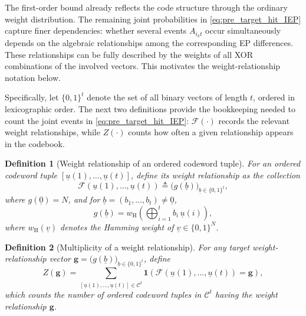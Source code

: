 \documentclass[letterpaper,draftclsnofoot,onecolumn]{IEEEtran}
\newtheorem{definition}{Definition}
\begin{document}
The first-order bound already reflects the code structure through the ordinary weight distribution. The remaining joint probabilities in \eqref{eq:pre_target_hit_IEP} capture finer dependencies: whether several events $A_{i_k t}$ occur simultaneously depends on the algebraic relationships among the corresponding EP differences. These relationships can be fully described by the weights of all XOR combinations of the involved vectors. This motivates the weight-relationship notation below.

Specifically, let $\{0,1\}^t$ denote the set of all binary vectors of length $t$, ordered in lexicographic order. The next two definitions provide the bookkeeping needed to count the joint events in \eqref{eq:pre_target_hit_IEP}: $\mathcal{F}(\cdot)$ records the relevant weight relationships, while $Z(\cdot)$ counts how often a given relationship appears in the codebook.


\begin{definition}[Weight relationship of an ordered codeword tuple]
For an ordered codeword tuple $[\underline{u}(1),\ldots,\underline{u}(t)]$, define its weight relationship as the collection
\begin{equation}\label{eq:def_weight_relationship}
\mathcal{F}(\underline{u}(1),\ldots,\underline{u}(t))
\triangleq
\bigl(g(\underline{b})\bigr)_{\underline{b}\in\{0,1\}^t},
\end{equation}
where $g(\underline{0}) = N$, and for $\underline{b}=(b_1,\ldots,b_t)\neq \underline{0}$,
\begin{equation}
g(\underline{b})
= w_{\mathrm{H}}\!\left(
\bigoplus_{i=1}^{t} b_i\,\underline{u}(i)
\right),
\label{eq:def_g}
\end{equation}
where $w_{\mathrm{H}}(\underline{v})$ denotes the Hamming weight of $\underline{v}\in\{0,1\}^N$.
\end{definition}

\begin{definition}[Multiplicity of a weight relationship]
For any target weight-relationship vector $\mathbf{g}=\bigl(g(\underline{b})\bigr)_{\underline{b}\in\{0,1\}^t}$, define
\begin{equation}\label{eq:def_Z}
Z(\mathbf{g})
=
\sum_{[\underline{u}(1),\ldots,\underline{u}(t)]\in \mathcal{C}^t}
\mathbf{1}\!\left(
\mathcal{F}(\underline{u}(1),\ldots,\underline{u}(t))=\mathbf{g}
\right),
\end{equation}
which counts the number of ordered codeword tuples in $\mathcal{C}^t$ having the weight relationship $\mathbf{g}$.
\end{definition}
\end{document}

